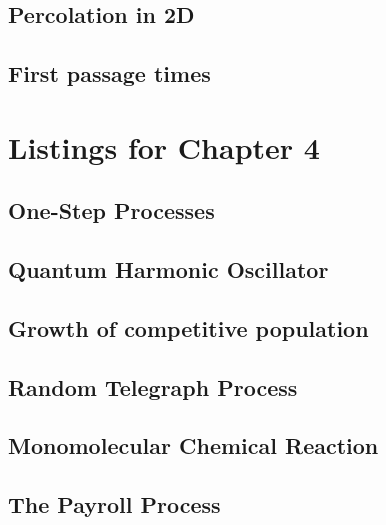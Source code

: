 \subsection{Percolation in 2D}

\subsection{First passage times}

\section{Listings for Chapter 4}

\subsection{One-Step Processes}

\subsection{Quantum Harmonic Oscillator}

\subsection{Growth of competitive population}

\subsection{Random Telegraph Process}

\subsection{Monomolecular Chemical Reaction}

\subsection{The Payroll Process}


